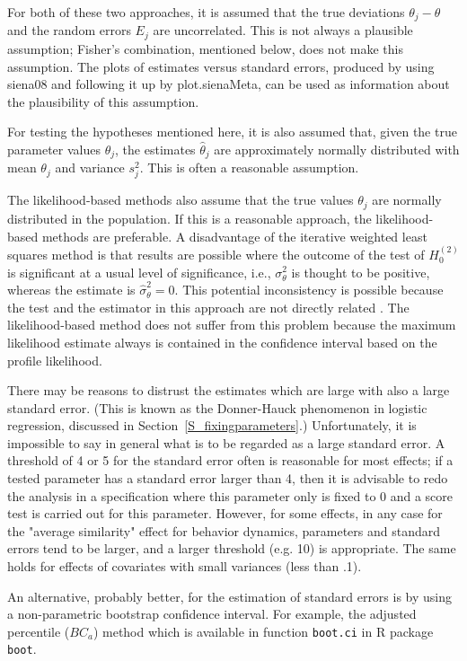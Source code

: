 \documentclass[a4paper,fleqn,11pt]{article}
\newcommand{\+}{\, + \,}
\newcommand{\R}{{\sf R }}
\begin{document}
For both of these two approaches,
it is assumed that the true deviations $\theta_j - \theta$
and the random errors $E_j$ are uncorrelated.
This is not always a plausible assumption; Fisher's combination,
mentioned below, does not make this assumption.
The plots of estimates versus standard errors, produced
by using \textsf{siena08} and following it up by
\textsf{plot.sienaMeta}, can be used as information about the
plausibility of this assumption.

For testing the hypotheses mentioned here, it is also assumed that,
given the true parameter values $\theta_j$, the
estimates $\hat{\theta}_j$ are approximately normally distributed
with mean $\theta_j$ and variance $s^2_j$.
This is often a reasonable assumption.

The likelihood-based methods also assume that the true values
$\theta_j$ are normally distributed in the population.
If this is a reasonable approach, the likelihood-based methods
are preferable.
A disadvantage of the iterative weighted least squares method
is that results are possible
where the outcome of the test of $H_0^{(2)}$ is significant
at a usual level of significance,
i.e., $\sigma^2_\theta$ is thought to be positive, whereas
the estimate is $\hat\sigma^2_\theta = 0$.
This  potential inconsistency is possible because the test
and the estimator in this approach are not directly related
\citep[cf.][]{SnijdersBaerveldt03}.
The likelihood-based method does not suffer from this problem
because the maximum likelihood estimate always is contained
in the confidence interval based on the profile likelihood.
\bigskip

There may be reasons to distrust the estimates which are
large with also a large standard error. (This is known as the Donner-Hauck
phenomenon in logistic regression, discussed in
Section~\ref{S_fixingparameters}.)
Unfortunately, it is impossible to say in
general what is to be regarded as a large standard error.
A threshold of 4 or 5 for the standard error often is reasonable
for most effects; if a tested
parameter has a standard error larger than 4, then it is advisable to redo
the analysis in a specification where this parameter only is fixed to 0 and a
score test is carried out for this parameter. However, for some effects, in
any case for the "average similarity" effect for behavior dynamics,
parameters and standard errors tend to be larger, and a larger threshold
(e.g. 10) is appropriate. The same holds for effects of covariates with small
variances (less than .1).

An alternative, probably better, for the estimation of standard errors
is by using a non-parametric bootstrap confidence interval. For example, the
adjusted percentile ($BC_a$) method
\citep[][Chapter 5]{Efron1987,DavisonHinkley1997}
which is available in function \texttt{boot.ci} in \R package \texttt{boot}.
\end{document}
